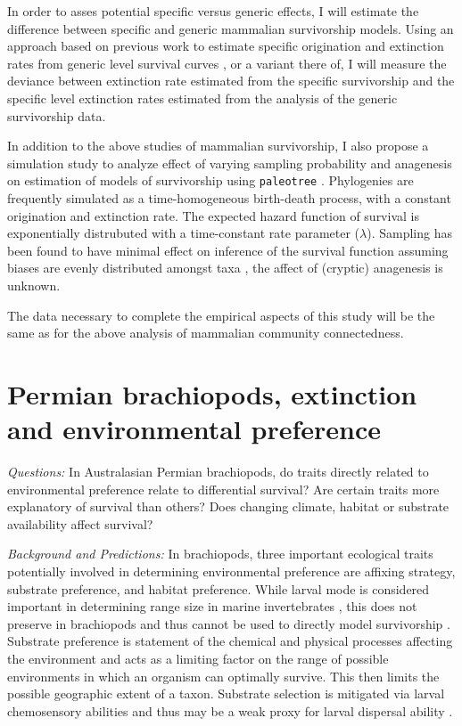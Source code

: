 \documentclass[12pt,letterpaper]{article}
\begin{document}
In order to asses potential specific versus generic effects, I will estimate the difference between specific and generic mammalian survivorship models. Using an approach based on previous work to estimate specific origination and extinction rates from generic level survival curves \citep{Foote1988}, or a variant there of, I will measure the deviance between extinction rate estimated from the specific survivorship and the specific level extinction rates estimated from the analysis of the generic survivorship data. 

In addition to the above studies of mammalian survivorship, I also propose a simulation study to analyze effect of varying sampling probability and anagenesis on estimation of models of survivorship using \texttt{paleotree} \citep{Bapst2012a}. Phylogenies are frequently simulated as a time-homogeneous birth-death process, with a constant origination and extinction rate. The expected hazard function of survival is exponentially distrubuted with a time-constant rate parameter (\(\lambda\)). Sampling has been found to have minimal effect on inference of the survival function assuming biases are evenly distributed amongst taxa \citep{Sepkoski1975}, the affect of (cryptic) anagenesis is unknown. 

The data necessary to complete the empirical aspects of this study will be the same as for the above analysis of mammalian community connectedness.


\section{Permian brachiopods, extinction and environmental preference}

\textit{Questions:} In Australasian Permian brachiopods, do traits directly related to environmental preference relate to differential survival? Are certain traits more explanatory of survival than others? Does changing climate, habitat or substrate availability affect survival?

\textit{Background and Predictions:}
In brachiopods, three important ecological traits potentially involved in determining environmental preference are affixing strategy, substrate preference, and habitat preference. While larval mode is considered important in determining range size in marine invertebrates \citep{Jablonski2006a,Jablonski1983}, this does not preserve in brachiopods and thus cannot be used to directly model survivorship \citep{Jablonski1983}. Substrate preference is statement of the chemical and physical processes affecting the environment and acts as a limiting factor on the range of possible environments in which an organism can optimally survive. This then limits the possible geographic extent of a taxon. Substrate selection is mitigated via larval chemosensory abilities and thus may be a weak proxy for larval dispersal ability \citep{Jablonski2006a,Jablonski1983}. 
\end{document}
